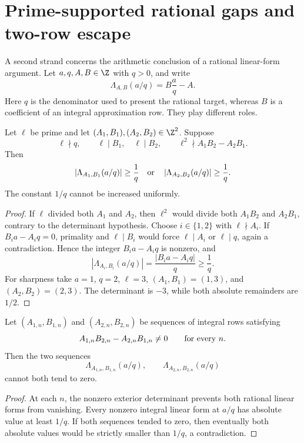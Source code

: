 \section{Prime-supported rational gaps and two-row escape}
\label{sec:prime-support}

A second strand concerns the arithmetic conclusion of a rational linear-form
argument.  Let \(a,q,A,B\in\Z\) with \(q>0\), and
write
\[
  \Lambda_{A,B}(a/q)=B\frac aq-A .
\]
Here \(q\) is the denominator used to present the rational target, whereas
\(B\) is a coefficient of an integral approximation row.  They play different
roles.

\begin{theorem}
\label{res:prime-supported-two-selector-gap}
Let \(\ell\) be prime and let
\((A_1,B_1),(A_2,B_2)\in\Z^2\).  Suppose
\[
 \ell\nmid q,\qquad
 \ell\mid B_1,\quad \ell\mid B_2,\qquad
 \ell^2\nmid A_1B_2-A_2B_1 .
\]
Then
\[
 \left|\Lambda_{A_1,B_1}(a/q)\right|\ge\frac1q
 \quad\hbox{or}\quad
 \left|\Lambda_{A_2,B_2}(a/q)\right|\ge\frac1q .
\]
The constant \(1/q\) cannot be increased uniformly.
\end{theorem}

\begin{proof}
If \(\ell\) divided both \(A_1\) and \(A_2\), then \(\ell^2\) would divide
both \(A_1B_2\) and \(A_2B_1\), contrary to the determinant hypothesis.
Choose \(i\in\{1,2\}\) with \(\ell\nmid A_i\).  If
\(B_i a-A_iq=0\), primality and \(\ell\mid B_i\) would force
\(\ell\mid A_i\) or \(\ell\mid q\), again a contradiction.  Hence the
integer \(B_i a-A_iq\) is nonzero, and
\[
 \left|\Lambda_{A_i,B_i}(a/q)\right|
 =\frac{|B_i a-A_iq|}{q}\ge\frac1q .
\]
For sharpness take \(a=1\), \(q=2\), \(\ell=3\),
\((A_1,B_1)=(1,3)\), and \((A_2,B_2)=(2,3)\).  The determinant is \(-3\),
while both absolute remainders are \(1/2\).
\end{proof}

\begin{corollary}
\label{res:rational-two-selector-no-double-decay}
Let \((A_{1,n},B_{1,n})\) and \((A_{2,n},B_{2,n})\) be sequences of integral
rows satisfying
\[
 A_{1,n}B_{2,n}-A_{2,n}B_{1,n}\ne0
 \qquad\hbox{for every }n .
\]
Then the two sequences
\[
 \Lambda_{A_{1,n},B_{1,n}}(a/q),
 \qquad
 \Lambda_{A_{2,n},B_{2,n}}(a/q)
\]
cannot both tend to zero.
\end{corollary}

\begin{proof}
At each \(n\), the nonzero exterior determinant prevents both rational linear
forms from vanishing.  Every nonzero integral linear form at \(a/q\) has
absolute value at least \(1/q\).  If both sequences tended to zero, then
eventually both absolute values would be strictly smaller than \(1/q\), a
contradiction.
\end{proof}

